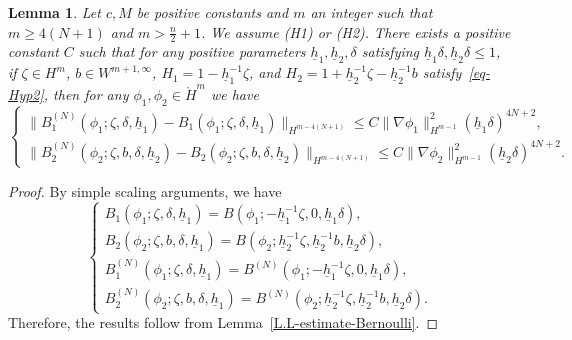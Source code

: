 \documentclass[11pt,leqno]{article}
\newtheorem{lemma}[theorem]{\bf Lemma}
\numberwithin{equation}{section}
\numberwithin{figure}{section}
\begin{document}
\begin{lemma}\label{L.res2}
Let $c, M$ be positive constants and $m$ an integer such that $m\geq 4(N+1)$ and $m>\frac{n}{2}+1$. 
We assume {\rm (H1)} or {\rm (H2)}. 
There exists a positive constant $C$ such that for any positive parameters 
$\underline{h}_1, \underline{h}_2, \delta$ satisfying $\underline{h}_1\delta, \underline{h}_2\delta \leq 1$, 
if $\zeta\in H^m$, $b\in W^{m+1,\infty}$, $H_1 = 1 - \underline{h}_1^{-1}\zeta$, 
and $H_2 = 1 + \underline{h}_2^{-1}\zeta - \underline{h}_2^{-1}b$ satisfy~\eqref{eq-Hyp2}, 
then for any $\phi_1,\phi_2 \in \mathring{H}^m$ we have 
%
\[
\begin{cases}
 \|B_1^{(N)}(\phi_1;\zeta,\delta,\underline{h}_1) - B_1(\phi_1;\zeta,\delta,\underline{h}_1)\|_{H^{m-4(N+1)}}
 \leq C \|\nabla \phi_1\|_{H^{m-1}}^2(\underline{h}_1\delta)^{4N+2}, \\
 \|B_2^{(N)}(\phi_2;\zeta,b,\delta,\underline{h}_2) - B_2(\phi_2;\zeta,b,\delta,\underline{h}_2)\|_{H^{m-4(N+1)}}
 \leq C \|\nabla \phi_2\|_{H^{m-1}}^2(\underline{h}_2\delta)^{4N+2}.
\end{cases}
\]
\end{lemma}


\begin{proof}
By simple scaling arguments, we have 
%
\[
\begin{cases}
 B_1(\phi_1;\zeta,\delta,\underline{h}_1)
  = B(\phi_1;-\underline{h}_1^{-1}\zeta,0,\underline{h}_1\delta), \\
 B_2(\phi_2;\zeta,b,\delta,\underline{h}_1)
  = B(\phi_2;\underline{h}_2^{-1}\zeta,\underline{h}_2^{-1}b,\underline{h}_2\delta), \\
 B_1^{(N)}(\phi_1;\zeta,\delta,\underline{h}_1)
  = B^{(N)}(\phi_1;-\underline{h}_1^{-1}\zeta,0,\underline{h}_1\delta), \\
 B_2^{(N)}(\phi_2;\zeta,b,\delta,\underline{h}_1)
  = B^{(N)}(\phi_2;\underline{h}_2^{-1}\zeta,\underline{h}_2^{-1}b,\underline{h}_2\delta).
\end{cases}
\]
%
Therefore, the results follow from Lemma~\ref{L.L-estimate-Bernoulli}. 
\end{proof}
\end{document}

